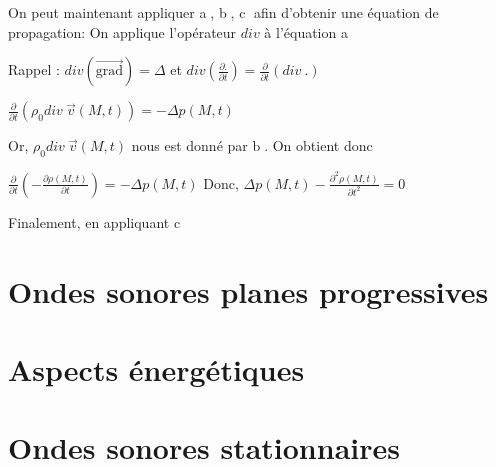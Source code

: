 \documentclass[a4paper, 12pt]{article}
\begin{document}
On peut maintenant appliquer \textcircled{a}, \textcircled{b}, \textcircled{c} afin d'obtenir une équation de propagation:\newline
On applique l'opérateur $div$ à l'équation \textcircled{a}
\begin{flushright}
Rappel : $div(\overrightarrow{\textrm{grad}})=\Delta$ et $div(\frac{\partial .}{\partial t})=\frac{\partial}{\partial t}(div\:.)$
\end{flushright}
\begin{center}
$\frac{\partial}{\partial t}(\rho_0div\:\vec{v}(M,t))=-\Delta p(M,t)$
\end{center}
Or, $\rho_0div\:\vec{v}(M,t)$ nous est donné par \textcircled{b}. On obtient donc
\begin{center}
$\frac{\partial}{\partial t}(-\frac{\partial \rho(M,t)}{\partial t})=-\Delta p(M,t)$\newline \newline
Donc, $\Delta p(M,t)-\frac{\partial^2 \rho(M,t)}{\partial t^2}=0$
\end{center}
Finalement, en appliquant \textcircled{c}

\noindent{}

\newpage
\section{Ondes sonores planes progressives}

\newpage
\section{Aspects énergétiques}

\newpage
\section{Ondes sonores stationnaires}
\end{document}
